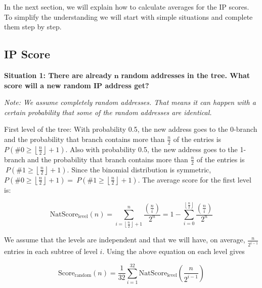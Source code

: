 In the next section, we will explain how to calculate averages for the IP scores. To simplify the understanding we will start with simple situations and complete them step by step.

\subsection{IP Score}
\textbf{Situation 1: There are already} \(\mathbf{n}\) \textbf{random
addresses in the tree. What score will a new random IP address get?}

\emph{Note: We assume completely random addresses. That means it can
happen with a certain probability that some of the random addresses are
identical.}

First level of the tree: With probability 0.5, the new address goes to the 0-branch
and the probability that branch contains more than \(\frac{n}{2}\) of
the entries is
\(P(\# 0 \geq \left\lfloor \frac{n}{2} \right\rfloor + 1)\). Also with
probability 0.5, the new address goes to the 1-branch and the
probability that branch contains more than \(\frac{n}{2}\) of the
entries is\(\ P(\# 1 \geq \left\lfloor \frac{n}{2} \right\rfloor + 1).\)
Since the binomial distribution is symmetric,
\(P\left( \# 0 \geq \left\lfloor \frac{n}{2} \right\rfloor + 1 \right) = \ P(\# 1 \geq \left\lfloor \frac{n}{2} \right\rfloor + 1)\).
The average score for the first level is:

\[\text{NatScore}_{\text{level}}(n) = \sum_{i = \left\lfloor \frac{n}{2} \right\rfloor + 1}^{n}\frac{\left( \frac{n}{i} \right)}{2^{n}} = 1 - \sum_{i = 0}^{\left\lfloor \frac{n}{2} \right\rfloor}\frac{\left( \frac{n}{i} \right)}{2^{n}}\]


We assume that the levels are independent and that we will have, on
average, \(\frac{n}{2^{i - 1}}\) entries in each subtree of level \(i\).
Using the above equation on each level gives

\[\text{Score}_{\text{random}}(n) = \frac{1}{32} \sum_{i = 1}^{32}{\text{NatScore}_{\text{level}}\left( \frac{n}{2^{i - 1}} \right)}\]

